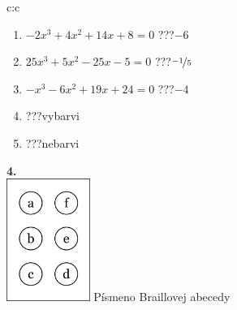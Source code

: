 \documentclass[10pt]{report}
\begin{document}
\begin{tabular}{c:c}
\begin{minipage}[c][104.5mm][t]{0.5\linewidth}
\begin{center}
\begin{minipage}{0.79\linewidth}
\begin{center}
\begin{varwidth}{\linewidth}
\begin{enumerate}
\item $-2x^3+4x^2+14x+8=0$\quad \dotfill\; ???\;\dotfill \quad $-6$
\item $25x^3+5x^2-25x-5=0$\quad \dotfill\; ???\;\dotfill \quad $\nicefrac{-1}{5}$
\item $-x^3-6x^2+19x+24=0$\quad \dotfill\; ???\;\dotfill \quad $-4$
\item \quad \dotfill\; ???\;\dotfill \quad vybarvi
\item \quad \dotfill\; ???\;\dotfill \quad nebarvi
\end{enumerate}
\end{varwidth}
\end{center}
\end{minipage}
\begin{minipage}{0.20\linewidth}
\begin{center}
{\Huge\bfseries 4.} \\[2mm]
\includegraphics[height=40mm]{../images/braille.png}
{\small Písmeno Braillovej abecedy}
\end{center}
\end{minipage}
\end{center}
\end{minipage}
%
\end{tabular}
\newpage
\thispagestyle{empty}
\end{document}
